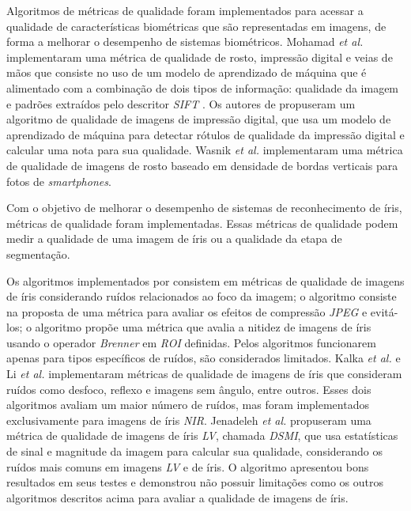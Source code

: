 \par Algoritmos de métricas de qualidade foram implementados para acessar a qualidade de características biométricas que são representadas em imagens, de forma a melhorar o desempenho de sistemas biométricos. Mohamad \textit{et al.} \cite{mohamad2015} implementaram uma métrica de qualidade de rosto, impressão digital e veias de mãos que consiste no uso de um modelo de aprendizado de máquina que é alimentado com a combinação de dois tipos de informação: qualidade da imagem e padrões extraídos pelo descritor \textit{\acrshort{SIFT}} \cite{lowe2004}. Os autores de \cite{sharma2017} propuseram um algoritmo de qualidade de imagens de impressão digital, que usa um modelo de aprendizado de máquina para detectar rótulos de qualidade da impressão digital e calcular uma nota para sua qualidade. Wasnik \textit{et al.} \cite{wasnik2017} implementaram uma métrica de qualidade de imagens de rosto baseado em densidade de bordas verticais para fotos de \textit{smartphones}.

\par Com o objetivo de melhorar o desempenho de sistemas de reconhecimento de íris, métricas de qualidade foram implementadas. Essas métricas de qualidade podem medir a qualidade de uma imagem de íris ou a qualidade da etapa de segmentação.

\par Os algoritmos implementados por \cite{daugman2004, starovoitov2013-DSMI-45, wan2007-DSMI-50} consistem em métricas de qualidade de imagens de íris considerando ruídos relacionados ao foco da imagem; o algoritmo \cite{bergmller2017-DSMI-2} consiste na proposta de uma métrica para avaliar os efeitos de compressão \textit{JPEG} e evitá-los; o algoritmo \cite{chen2013-DSMI-4} propõe uma métrica que avalia a nitidez de imagens de íris usando o operador \textit{Brenner} em \textit{\acrfull{ROI}} definidas. Pelos algoritmos \cite{daugman2004, starovoitov2013-DSMI-45, wan2007-DSMI-50,bergmller2017-DSMI-2,chen2013-DSMI-4} funcionarem apenas para tipos específicos de ruídos, são considerados limitados. Kalka \textit{et al.} \cite{kalka2010-DSMI-18} e Li \textit{et al.} \cite{li2011} implementaram métricas de qualidade de imagens de íris que consideram ruídos como desfoco, reflexo e imagens sem ângulo, entre outros. Esses dois algoritmos avaliam um maior número de ruídos, mas foram implementados exclusivamente para imagens de íris \textit{\acrshort{NIR}}. Jenadeleh \textit{et al.} \cite{Jenadeleh_2018_CVPR_Workshops} propuseram uma métrica de qualidade de imagens de íris \textit{\acrshort{LV}}, chamada \textit{\acrshort{DSMI}}, que usa estatísticas de sinal e magnitude da imagem para calcular sua qualidade, considerando os ruídos mais comuns em imagens \textit{\acrshort{LV}} e de íris. O algoritmo apresentou bons resultados em seus testes e demonstrou não possuir limitações como os outros algoritmos descritos acima para avaliar a qualidade de imagens de íris.

